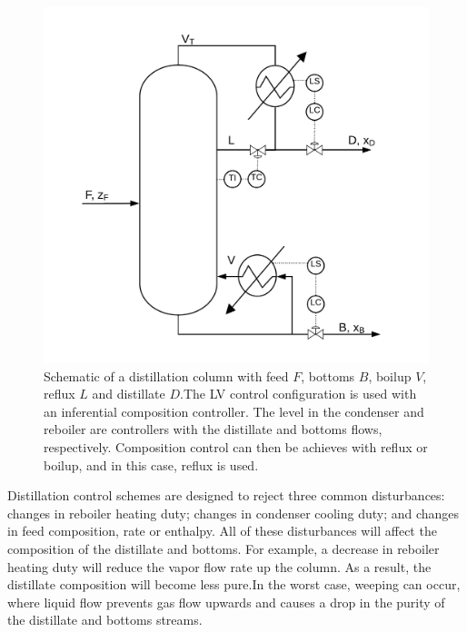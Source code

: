 \begin{figure}[t]
  \centering
  \includegraphics[height=0.3\textheight]{gfx/Chapter05/lv_configuration_inferential.png}
  \caption{Schematic of a distillation column with feed $F$, bottoms $B$, boilup $V$, reflux $L$ and distillate $D$.The  LV control configuration is used with an inferential composition controller. The level in the condenser and reboiler are controllers with the distillate and bottoms flows, respectively. Composition control can then be achieves with reflux or boilup, and in this case, reflux is used.}
  \label{lv_config}
\end{figure}

Distillation control schemes are designed to reject three common disturbances: changes in reboiler heating duty;  changes in condenser cooling duty; and changes in feed composition, rate or enthalpy.\citep{Riggs2006} All of these disturbances will affect the composition of the distillate and bottoms.  For example, a decrease in reboiler heating duty will reduce the vapor flow rate up the column.  As a result, the distillate composition will become less pure.\footnotemark   In the worst case, weeping can occur, where liquid flow prevents gas flow upwards and causes a drop in the purity of the distillate and bottoms streams. 

